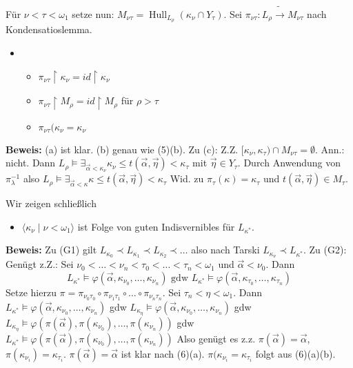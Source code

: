 \documentclass[a4paper,fontsize=11pt]{scrartcl}
\newcommand{\Hull}{\operatorname{Hull}}
\begin{document}
		Für $\nu<\tau<\omega_1$ setze nun: $M_{\nu\tau}=\Hull_{L_{\rho}}(\kappa_{\nu}\cap Y_{\tau})$.
		Sei $\pi_{\nu\tau}\colon L_{\rho}\tilde\to M_{\nu\tau}$ nach Kondensatioslemma.
		\begin{itemize}
			\item[(6)] \begin{itemize}
					\item[(a)] $\pi_{\nu\tau}\upharpoonright \kappa_{\nu} = id\upharpoonright \kappa_{\nu}$
					\item[(b)] $\pi_{\nu\tau}\upharpoonright M_{\rho} = id\upharpoonright M_{\rho}$ für $\rho>\tau$
					\item[(c)] $\pi_{\nu\tau}(\kappa_{\nu}=\kappa_{\nu}$
				\end{itemize}
		\end{itemize}

		{\bf Beweis:} (a) ist klar. (b) genau wie (5)(b). 
			Zu (c): Z.Z. $[\kappa_{\nu},\kappa_{\tau})\cap M_{\nu\tau}=\emptyset$.
			Ann.: nicht.
			Dann $L_{\rho}\models\exists_{\vec\alpha<\kappa_{\nu}} \kappa_{\nu}\le t(\vec\alpha,\vec\eta)<\kappa_{\tau}$ mit $\vec\eta\in Y_{\tau}$.
			Durch Anwendung von $\pi^{-1}_{\lambda}$ also $L_{\rho}\models\exists_{\vec\alpha<\kappa} \kappa\le t(\vec\alpha,\vec\eta)<\kappa_{\tau}$
			Wid. zu $\pi_{\tau}(\kappa)=\kappa_{\tau}$ und $t(\vec\alpha,\vec\eta)\in M_{\tau}$.

		Wir zeigen schließlich \begin{itemize}
			\item[(7)] $\langle \kappa_{\nu}\mid \nu<\omega_1\rangle$ ist Folge von guten Indisvernibles für $L_{\kappa^*}$.
		\end{itemize}
		{\bf Beweis:} Zu (G1) gilt $L_{\kappa_0}\prec L_{\kappa_1}\prec L_{\kappa_2}\prec\ldots$ also nach Tarski $L_{\kappa_{\nu}}\prec L_{\kappa^*}$.
		Zu (G2): Genügt z.Z.: Sei $\nu_0<\ldots<\nu_n<\tau_0<\ldots<\tau_n<\omega_1$ und $\vec\alpha<\nu_0$.
		Dann \[ L_{\kappa^*}\models \varphi(\vec\alpha,\kappa_{\nu_0},\ldots,\kappa_{\nu_n}) \mbox{ gdw } 
								L_{\kappa^*}\models\varphi(\vec\alpha, \kappa_{\tau_0},\ldots, \kappa_{\tau_n})\]
		Setze hierzu $\pi=\pi_{\nu_0\tau_0}\circ\pi_{\nu_1\tau_1}\circ\ldots\circ\pi_{\nu_n\tau_n}$.
		Sei $\tau_n<\eta<\omega_1$.
		Dann $L_{\kappa^*}\models\varphi(\vec\alpha,\kappa_{\nu_0},\ldots,\kappa_{\nu_n})$ gdw 
				$L_{\kappa_{\eta}}\models \varphi(\vec\alpha,\kappa_{\nu_0},\ldots,\kappa_{\nu_n})$ gdw
				$L_{\kappa_{\eta}}\models \varphi(\pi(\vec\alpha),\pi(\kappa_{\nu_0}),\ldots,\pi(\kappa_{\nu_n}))$ gdw
				$L_{\kappa^*}\models \varphi(\pi(\vec\alpha),\pi(\kappa_{\nu_0}),\ldots,\pi(\kappa_{\nu_n}))$
		Also genügt es z.z. $\pi(\vec\alpha)=\vec\alpha$, $\pi(\kappa_{\nu_i})=\kappa_{\tau_i}$.
		$\pi(\vec\alpha)=\vec\alpha$ ist klar nach (6)(a).
		$\pi(\kappa_{\nu_i}=\kappa_{\tau_i}$ folgt aus (6)(a)(b).
		
\end{document}
